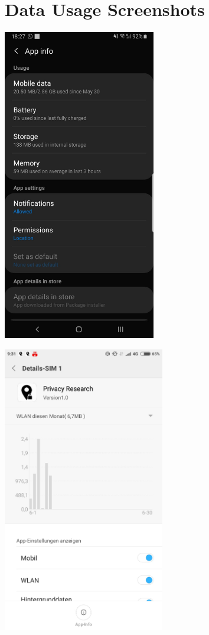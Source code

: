 \chapter{Data Usage Screenshots}
\begin{center}
\includegraphics[width=0.5\textwidth]{data/data-usage/data-usage1.jpeg}
\end{center}
\begin{center}
\includegraphics[width=200pt]{data/data-usage/data-usage2-1.jpeg}
\end{center}
